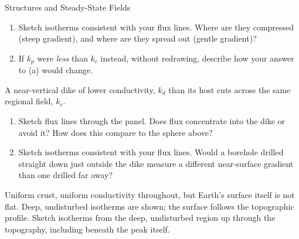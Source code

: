 \begin{activity}{Structures and Steady-State Fields}
\begin{questions}
\begin{enumerate}[label=(\alph*)]
    \item Sketch isotherms consistent with your flux lines. Where are they compressed (steep gradient), and where are they spread out (gentle gradient)?
    \answerbox[2cm]

    \item If $k_p$ were \emph{less} than $k_c$ instead, without redrawing, describe how your answer to (a) would change.
    \answerbox[2cm]
\end{enumerate}

A near-vertical dike of lower conductivity, $k_d$ than its host cuts across the same regional field, $k_c$.

\begin{center}
\end{center}

\begin{enumerate}[label=(\alph*)]
    \item Sketch flux lines through the panel. Does flux concentrate into the dike or avoid it?  How does this compare to the sphere above?
    \answerbox[3cm]

    \item Sketch isotherms consistent with your flux lines. Would a borehole drilled straight down just outside the dike measure a different near-surface gradient than one drilled far away?
    \answerbox[2.5cm]
\end{enumerate}

Uniform crust, uniform conductivity throughout, but Earth's surface itself is not flat. Deep, undisturbed isotherms are shown; the surface follows the topographic profile. Sketch isotherms from the deep, undisturbed region up through the topography, including beneath the peak itself. 

\begin{center}
\end{center}


\end{questions}
\end{activity}
